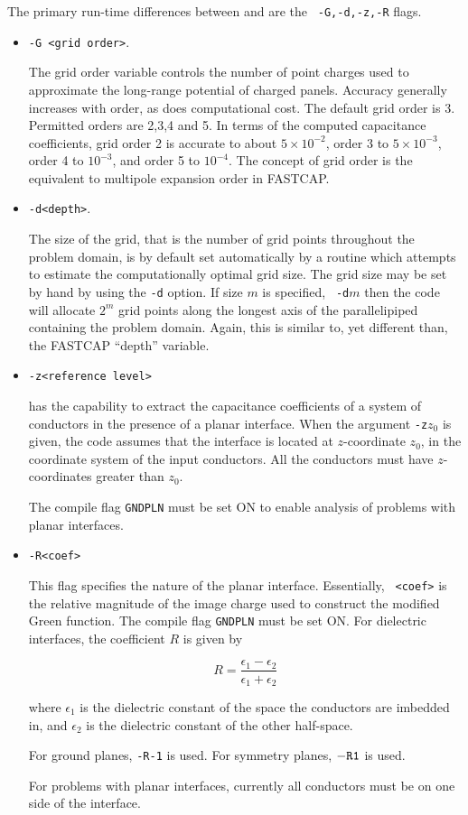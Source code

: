 The primary run-time differences between \thecode and \fastcap are the {\tt
  -G,-d,-z,-R} flags. 

\begin{itemize}

\item {\tt -G <grid order>}. 

  The grid order variable controls the number of point charges used to
  approximate the long-range potential of charged panels. Accuracy
  generally increases with order, as does computational cost.  The default
  grid order is 3.  Permitted orders are 2,3,4 and 5.  In terms of the
  computed capacitance coefficients, grid order 2 is accurate to about $5 \times 10^{-2}$,
  order 3 to $5 \times 10^{-3}$, order 4 to  $10^{-3}$, and order 5 to
  $10^{-4}$.  The concept of grid order is the \thecode equivalent to
  multipole expansion order in FASTCAP. 

\item {\tt -d<depth>}. 

The size of the grid, that is the number of grid points throughout the
problem domain, is by default set automatically by a routine which attempts
to estimate the computationally optimal grid size.   The grid size may be
set by hand by using the {\tt -d} option.  If size $m$ is specified, {\tt
  -d$m$} then the code will allocate $2^m$ grid points along the longest
axis of the parallelipiped containing the problem domain.  Again, this is
similar to, yet different than, the FASTCAP ``depth'' variable. 

\item {\tt -z<reference level>} 

\thecode has the capability to extract the capacitance coefficients of a
system of conductors in the presence of a planar interface.  When the
argument {\tt -z$z_0$} is given, the code assumes that the interface is
located at $z$-coordinate $z_0$, in the coordinate system of the input
conductors.  All the conductors must have $z$-coordinates greater than
$z_0.$ 

The compile flag
{\tt GNDPLN} must be set {ON} to enable analysis of problems with planar
interfaces. 

\item {\tt -R<coef>} 

This flag specifies the nature of the planar interface.  Essentially, {\tt
  <coef>} is the relative magnitude of the image charge used to construct
the modified Green function. The compile flag
{\tt GNDPLN} must be set {ON}.  For dielectric interfaces, the coefficient
$R$ is given by 

\[ R = \frac{\epsilon_1 - \epsilon_2}{\epsilon_1 + \epsilon_2} \] 

where $\epsilon_1$ is the dielectric constant of the space the conductors
are imbedded in, and $\epsilon_2$ is the dielectric constant of the other
half-space. 

For ground planes,  {\tt -R-1} is used.  For symmetry planes, ${\tt -R1}$
is used. 

For problems with planar interfaces, currently all conductors must be on
one side of the interface. 

\end{itemize}

